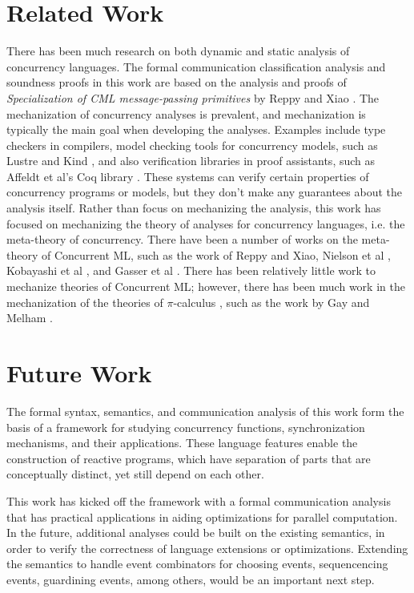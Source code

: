 \documentclass[letterpaper, 11pt]{extarticle}
\begin{document}
  



\section{Related Work}
There has been much research on both dynamic and static analysis of concurrency languages. 
The formal communication classification analysis and soundness proofs in this work are
based on the analysis and proofs of \textit{Specialization of CML message-passing primitives}
by Reppy and Xiao \cite{reppy2007specialization}.
The mechanization of concurrency analyses is prevalent, and mechanization is typically the main
goal when developing the analyses. Examples include type checkers in compilers,
model checking tools for concurrency models, such as Lustre \cite{halbwachs1991synchronous} and Kind \cite{kind},
and also verification libraries in proof assistants, such as Affeldt et al's Coq library \cite{affeldt2008coq}.
These systems can verify certain properties of concurrency programs or models, but they don't
make any guarantees about the analysis itself.
Rather than focus on mechanizing the analysis, this work has focused on
mechanizing the theory of analyses for concurrency languages, i.e. the meta-theory of concurrency.
There have been a number of works on the meta-theory of Concurrent ML,
such as the work of Reppy and Xiao, Nielson et al \cite{nielson1994higher}, Kobayashi et al \cite{kobayashi1995static}, and Gasser et al \cite{gasser1997systematic}.
There has been relatively little work to mechanize theories of Concurrent ML; however,
there has been much work in the mechanization of the theories of $\pi$-calculus
\cite{milner1999communicating}, such as the work by Gay \cite{gay2001framework} and Melham \cite{melham1994mechanized}. 

\section{Future Work}
The formal syntax, semantics, and communication analysis of this work form the basis of
a framework for studying concurrency functions, synchronization mechanisms, and their
applications. These language features enable the construction of reactive programs, which
have separation of parts that are conceptually distinct, yet still depend on each
other.

This work has kicked off the framework with a formal communication analysis that has practical
applications in aiding optimizations for parallel computation. In the future, additional
analyses could be built on the existing semantics, in order to verify the correctness of language 
extensions or optimizations. Extending the semantics to handle event combinators for choosing
events, sequencencing events, guardining events, among others, would be an important next step.
\end{document}
